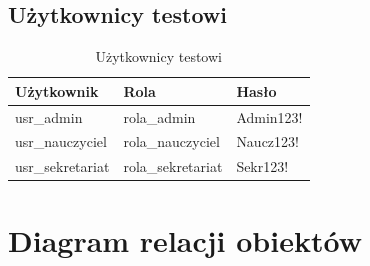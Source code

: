 \documentclass[12pt,a4paper]{article}
\begin{document}
\subsection{Użytkownicy testowi}

\begin{table}[h]
\centering
\begin{tabular}{|l|l|l|}
\hline
\textbf{Użytkownik} & \textbf{Rola} & \textbf{Hasło} \\
\hline
usr\_admin & rola\_admin & Admin123! \\
usr\_nauczyciel & rola\_nauczyciel & Naucz123! \\
usr\_sekretariat & rola\_sekretariat & Sekr123! \\
\hline
\end{tabular}
\caption{Użytkownicy testowi}
\end{table}

\section{Diagram relacji obiektów}
\end{document}
